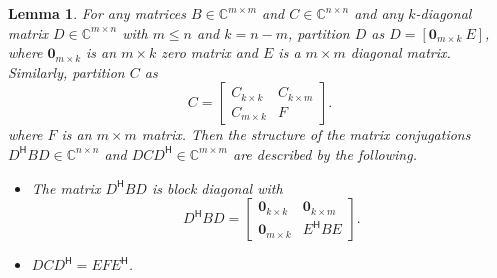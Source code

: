 \documentclass[12pt]{article}
\newcommand{\ctrans}[1]{{#1}^\mathsf{H}}	%
\newcommand{\zeroVec}{\bm{0}}	%
\newtheorem{lemma}{Lemma}[section]
\begin{document}
\begin{lemma}
\label{lem:k-diagonal}
For any matrices $B \in \mathbb{C}^{m \times m}$ and $C \in \mathbb{C}^{n \times n}$ and any $k$-diagonal matrix $D \in \mathbb{C}^{m \times n}$ with $m \leq n$ and $k = n-m$, partition $D$ as $D = [\zeroVec_{m \times k} ~ E]$, where $\zeroVec_{m \times k}$ is an $m \times k$ zero matrix and $E$ is a $m \times m$ diagonal matrix. Similarly, partition $C$ as
\[C = \begin{bmatrix}
C_{k \times k} & C_{k \times m} \\
C_{m \times k} & F
\end{bmatrix}.\]
where $F$ is an $m \times m$ matrix. Then the structure of the matrix conjugations $\ctrans{D}BD \in \mathbb{C}^{n \times n}$ and $DC\ctrans{D} \in \mathbb{C}^{m \times m}$ are described by the following.
\begin{itemize}
\item[(a)] The matrix $\ctrans{D}BD$ is block diagonal with
\[\ctrans{D}BD = \begin{bmatrix}
\zeroVec_{k \times k} & \zeroVec_{k \times m} \\
\zeroVec_{m \times k} & \ctrans{E}BE
\end{bmatrix}.\]
\item[(b)] $DC\ctrans{D} = EF\ctrans{E}$.
\end{itemize}
\end{lemma}
\end{document}
